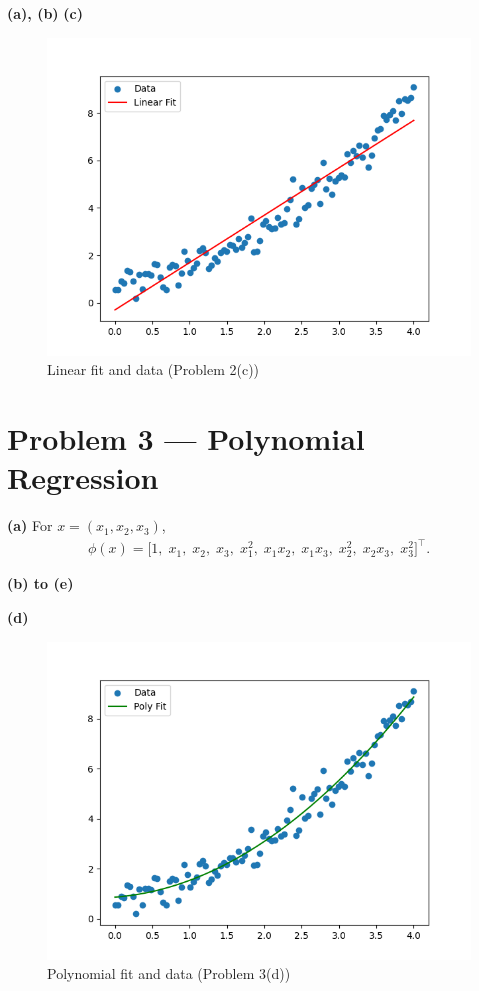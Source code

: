 \documentclass[11pt]{article}
\begin{document}
\noindent\textbf{(a), (b)} 
\noindent\textbf{(c)} 

\begin{figure}[H]
  \centering
  \includegraphics[width=0.7\linewidth]{2-c-output.png}
  \caption{Linear fit and data (Problem 2(c))}
  \label{fig:2c-linear-fit}
\end{figure}

\section*{Problem 3 --- Polynomial Regression}

\noindent\textbf{(a)} For $x=(x_1,x_2,x_3)$,
\begin{align*}
\phi(x) = \big[1,\; x_1,\; x_2,\; x_3,\; x_1^2,\; x_1x_2,\; x_1x_3,\; x_2^2,\; x_2x_3,\; x_3^2\big]^\top.
\end{align*}

\noindent\textbf{(b) to (e)} 

\noindent\textbf{(d)} 
\begin{figure}[H]
  \centering
  \includegraphics[width=0.7\linewidth]{3-d-output.png}
  \caption{Polynomial fit and data (Problem 3(d))}
  \label{fig:3d-poly-fit}
\end{figure}
\end{document}
